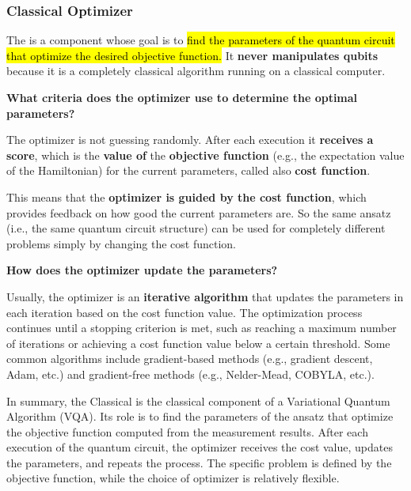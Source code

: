 \subsubsection{Classical Optimizer}\label{sec:classical-optimizer}

The  is a component whose goal is to \hl{find the parameters of the quantum circuit that optimize the desired objective function.} It \textbf{never manipulates qubits} because it is a completely classical algorithm running on a classical computer.

\highspace
\begin{flushleft}
    \textcolor{Green3}{ \textbf{What criteria does the optimizer use to determine the optimal parameters?}}
\end{flushleft}
The optimizer is not guessing randomly. After each execution it \textbf{receives a score}, which is the \textbf{value of} the \textbf{objective function} (e.g., the expectation value of the Hamiltonian) for the current parameters, called also \textbf{cost function}.

\highspace
This means that the \textbf{optimizer is guided by the cost function}, which provides feedback on how good the current parameters are. So the same ansatz (i.e., the same quantum circuit structure) can be used for completely different problems simply by changing the cost function.

\highspace
\begin{flushleft}
    \textcolor{Green3}{ \textbf{How does the optimizer update the parameters?}}
\end{flushleft}
Usually, the optimizer is an \textbf{iterative algorithm} that updates the parameters in each iteration based on the cost function value. The optimization process continues until a stopping criterion is met, such as reaching a maximum number of iterations or achieving a cost function value below a certain threshold. Some common algorithms include gradient-based methods (e.g., gradient descent, Adam, etc.) and gradient-free methods (e.g., Nelder-Mead, COBYLA, etc.).

\highspace
In summary, the Classical  is the classical component of a Variational Quantum Algorithm (VQA). Its role is to find the parameters of the ansatz that optimize the objective function computed from the measurement results. After each execution of the quantum circuit, the optimizer receives the cost value, updates the parameters, and repeats the process. The specific problem is defined by the objective function, while the choice of optimizer is relatively flexible.